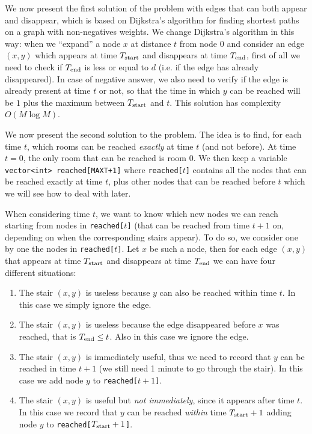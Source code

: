 \DijkstraModificato

We now present the first solution of the problem with edges that can both appear and disappear, which is based on Dijkstra's algorithm for finding shortest paths on a graph with non-negatives weights. We change Dijkstra's algorithm in this way: when we ``expand'' a node $x$ at distance $t$ from node $0$ and consider an edge $(x, y)$ which appears at time $T_{\mathrm{start}}$ and disappears at time $T_{\mathrm{end}}$, first of all we need to check if $T_{\mathrm{end}}$ is less or equal to $d$ (i.e. if the edge has already disappeared). In case of negative answer, we also need to verify if the edge is already present at time $t$ or not, so that the time in which $y$ can be reached will be $1$ plus the maximum between $T_{\mathrm{start}}$ and $t$. This solution has complexity $O(M\log M)$.


\SoluzioneLineare

We now present the second solution to the problem. The idea is to find, for each time $t$, which rooms can be reached \emph{exactly} at time $t$ (and not before). At time $t = 0$, the only room that can be reached is room $0$. We then keep a variable \texttt{vector<int> reached[MAXT+1]} where \texttt{reached[$t$]} contains all the nodes that can be reached exactly at time $t$, plus other nodes that can be reached before $t$ which we will see how to deal with later.

When considering time $t$, we want to know which new nodes we can reach starting from nodes in \texttt{reached[$t$]} (that can be reached from time $t+1$ on, depending on when the corresponding stairs appear). To do so, we consider one by one the nodes in \texttt{reached[$t$]}. Let $x$ be such a node, then for each edge $(x, y)$ that appears at time $T_{\mathrm{start}}$ and disappears at time $T_{\mathrm{end}}$ we can have four different situations:
\begin{enumerate}
	\item The stair $(x, y)$ is useless because $y$ can also be reached within time $t$. In this case we simply ignore the edge.
	\item The stair $(x, y)$ is useless because the edge disappeared before $x$ was reached, that is $T_{\mathrm{end}} \le t$. Also in this case we ignore the edge.
	\item The stair $(x, y)$ is immediately useful, thus we need to record that $y$ can be reached in time $t+1$ (we still need 1 minute to go through the stair). In this case we add node $y$ to \texttt{reached[$t+1$]}.
	\item The stair $(x, y)$ is useful but \emph{not immediately}, since it appears after time $t$. In this case we record that $y$ can be reached \emph{within} time $T_{\mathrm{start}}+1$ adding node $y$ to \texttt{reached[$T_{\mathrm{start}}+1$]}.
\end{enumerate}


